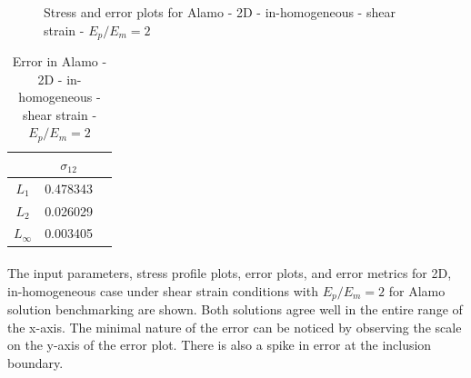 \documentclass[12pt, a4paper]{report}
\begin{document}
\begin{figure}[htbp]
  \centering
  \hfill
  \caption{Stress and error plots for Alamo - 2D - in-homogeneous - shear strain - $E_p/E_m = 2$}
\end{figure}

\begin{table}[H]
    \centering
    \begin{tabular}{|c|c|c|}
        \hline
        &\textbf{$\sigma_{12}$} \\
        \hline
        $L_1$ & 0.478343 \\
        \hline
        $L_2$ & 0.026029  \\
        \hline 
        $L_\infty$ & 0.003405\\
        \hline
    \end{tabular}
    \caption{Error in Alamo - 2D - in-homogeneous - shear strain - $E_p/E_m = 2$}
\end{table}

\paragraph{}
The input parameters, stress profile plots, error plots, and error metrics for 2D, in-homogeneous case under shear strain conditions with $E_p/E_m = 2$ for Alamo solution benchmarking are shown. Both solutions agree well in the entire range of the x-axis. The minimal nature of the error can be noticed by observing the scale on the y-axis of the error plot. There is also a spike in error at the inclusion boundary.
\end{document}
